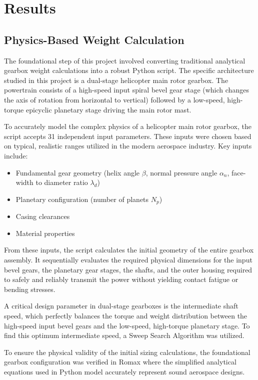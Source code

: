 \chapter{Results}
\section{Physics-Based Weight Calculation}
    The foundational step of this project involved converting traditional analytical gearbox weight 
    calculations into a robust Python script. The specific architecture studied in this project is a 
    dual-stage helicopter main rotor gearbox. The powertrain consists of a high-speed input spiral 
    bevel gear stage (which changes the axis of rotation from horizontal to vertical) followed by a 
    low-speed, high-torque epicyclic planetary stage driving the main rotor mast.

    To accurately model the complex physics of a helicopter main rotor gearbox, the script accepts 31 
    independent input parameters. These inputs were chosen based on typical, realistic ranges utilized 
    in the modern aerospace industry. Key inputs include:
		\begin{itemize}
			\item Fundamental gear geometry (helix angle $\beta$, normal pressure angle $\alpha_n$, face-width to diameter ratio $\lambda_d$)
			\item Planetary configuration (number of planets $N_p$)
			\item Casing clearances
			\item Material properties
		\end{itemize}

    From these inputs, the script calculates the initial geometry of the entire gearbox assembly. 
    It sequentially evaluates the required physical dimensions for the input bevel gears, the planetary gear 
    stages, the shafts, and the outer housing required to safely and reliably transmit the power without yielding 
    contact fatigue or bending stresses. 

    A critical design parameter in dual-stage gearboxes is the intermediate shaft speed, which perfectly 
    balances the torque and weight distribution between the high-speed input bevel gears and the low-speed, 
    high-torque planetary stage. To find this optimum intermediate speed, a Sweep Search Algorithm was utilized.  

    To ensure the physical validity of the initial sizing calculations, the foundational gearbox configuration 
    was verified in Romax where the simplified analytical equations used in Python model accurately represent 
    sound aerospace designs.

